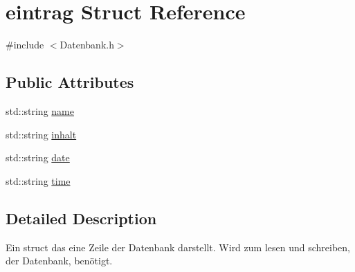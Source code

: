 \hypertarget{structeintrag}{\section{eintrag \-Struct \-Reference}
\label{structeintrag}
}


{\ttfamily \#include $<$\-Datenbank.\-h$>$}

\subsection*{\-Public \-Attributes}
{\bf }\par
\begin{DoxyCompactItemize}
\item 
std\-::string \hyperlink{structeintrag_a61e2ae30e5fd62927ec4b197fbb911c8}{name}
\item 
std\-::string \hyperlink{structeintrag_adc81caa378dd038281aac9b5af6048e6}{inhalt}
\item 
std\-::string \hyperlink{structeintrag_abf2e007bb4a5b1331448539ac5aee7ee}{date}
\item 
std\-::string \hyperlink{structeintrag_a62c9c521d27eaf89410d4044c1c4db16}{time}
\end{DoxyCompactItemize}



\subsection{\-Detailed \-Description}
\-Ein struct das eine \-Zeile der \-Datenbank darstellt. \-Wird zum lesen und schreiben, der \-Datenbank, benötigt. 

